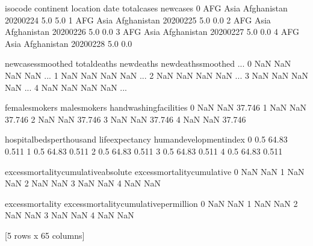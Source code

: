 \documentclass[letterpaper,10pt,english]{jupyterBook}
\begin{document}
\begin{sphinxVerbatim}[commandchars=\\\{\}]
  iso\PYGZus{}code continent     location        date  total\PYGZus{}cases  new\PYGZus{}cases  \PYGZbs{}
0      AFG      Asia  Afghanistan  2020\PYGZhy{}02\PYGZhy{}24          5.0        5.0   
1      AFG      Asia  Afghanistan  2020\PYGZhy{}02\PYGZhy{}25          5.0        0.0   
2      AFG      Asia  Afghanistan  2020\PYGZhy{}02\PYGZhy{}26          5.0        0.0   
3      AFG      Asia  Afghanistan  2020\PYGZhy{}02\PYGZhy{}27          5.0        0.0   
4      AFG      Asia  Afghanistan  2020\PYGZhy{}02\PYGZhy{}28          5.0        0.0   

   new\PYGZus{}cases\PYGZus{}smoothed  total\PYGZus{}deaths  new\PYGZus{}deaths  new\PYGZus{}deaths\PYGZus{}smoothed  ...  \PYGZbs{}
0                 NaN           NaN         NaN                  NaN  ...   
1                 NaN           NaN         NaN                  NaN  ...   
2                 NaN           NaN         NaN                  NaN  ...   
3                 NaN           NaN         NaN                  NaN  ...   
4                 NaN           NaN         NaN                  NaN  ...   

   female\PYGZus{}smokers  male\PYGZus{}smokers  handwashing\PYGZus{}facilities  \PYGZbs{}
0             NaN           NaN                  37.746   
1             NaN           NaN                  37.746   
2             NaN           NaN                  37.746   
3             NaN           NaN                  37.746   
4             NaN           NaN                  37.746   

   hospital\PYGZus{}beds\PYGZus{}per\PYGZus{}thousand  life\PYGZus{}expectancy  human\PYGZus{}development\PYGZus{}index  \PYGZbs{}
0                         0.5            64.83                    0.511   
1                         0.5            64.83                    0.511   
2                         0.5            64.83                    0.511   
3                         0.5            64.83                    0.511   
4                         0.5            64.83                    0.511   

   excess\PYGZus{}mortality\PYGZus{}cumulative\PYGZus{}absolute  excess\PYGZus{}mortality\PYGZus{}cumulative  \PYGZbs{}
0                                   NaN                          NaN   
1                                   NaN                          NaN   
2                                   NaN                          NaN   
3                                   NaN                          NaN   
4                                   NaN                          NaN   

   excess\PYGZus{}mortality  excess\PYGZus{}mortality\PYGZus{}cumulative\PYGZus{}per\PYGZus{}million  
0               NaN                                      NaN  
1               NaN                                      NaN  
2               NaN                                      NaN  
3               NaN                                      NaN  
4               NaN                                      NaN  

[5 rows x 65 columns]
\end{sphinxVerbatim}
\end{document}
